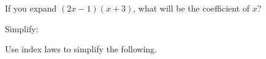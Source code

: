 \documentclass{source/quiz}
\begin{document}
\begin{questions}
\question[1] If you expand $(2x-1)(x+3)$, what will be the coefficient of $x$?
\vspace{0.5cm}

\begin{oneparchoices}
\end{oneparchoices}
\vspace{1cm}

\question[4] Simplify: \droppoints
{}

\question Use index laws to simplify the following. \droptotalpoints
\vspace{1cm}
\end{questions}
\end{document}

